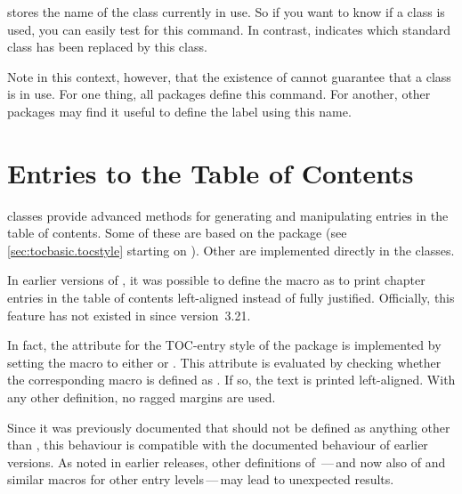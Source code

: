 \begin{Declaration}
\end{Declaration}
 stores the name of the \KOMAScript{} class currently in
use. So if you want to know if a \KOMAScript{} class is used, you can easily
test for this command. In contrast,  indicates which standard
class has been replaced by this \KOMAScript{} class.

Note in this context, however, that the existence of
 cannot guarantee that a
\KOMAScript{} class is in use. For one thing, all \KOMAScript{} packages
define this command. For another, other packages may find it useful to define
the \KOMAScript{} label using this name.%
% 
\EndIndexGroup

\section{Entries to the Table of Contents}

\KOMAScript{} classes provide advanced methods for generating and
manipulating entries in the table of contents. Some of these are based on
the  package (see \autoref{sec:tocbasic.tocstyle} starting
on ). Other are implemented directly in the
classes.

\begin{Declaration}
\end{Declaration}
In earlier versions of
\KOMAScript{}, it was possible to define the  macro
as  to print chapter entries in the table of contents
left-aligned instead of fully justified. Officially, this feature has not
existed in \KOMAScript{} since version~3.21.

In fact, the  attribute for the 
TOC-entry style of the  package is
implemented by setting the  macro to
either  or . This attribute is evaluated by
checking whether the corresponding macro is defined as . If
so, the text is printed left-aligned. With any other definition, no ragged
margins are used.

Since it was previously documented that  should not
be defined as anything other than , this behaviour is
compatible with the documented behaviour of earlier versions. As noted in
earlier releases, other definitions of \,---\,and
now also of  and similar macros for other entry
levels\,---\,may lead to unexpected results.


